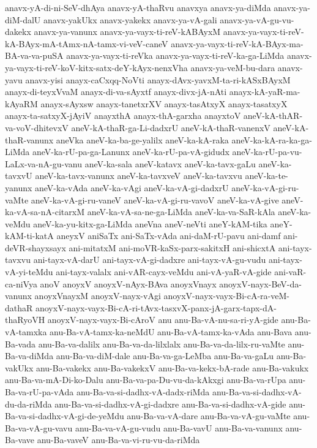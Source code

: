{anavx-yA-di-ni-SeV-dhAya
anavx-yA-thaRvu
anavxya
anavx-ya-diMda
anavx-ya-diM-dalU
anavx-yakUkx
anavx-yakekx
anavx-ya-vA-gali
anavx-ya-vA-gu-vu-dakekx
anavx-ya-vanunx
anavx-ya-vayx-ti-reV-kABAyxM
anavx-ya-vayx-ti-reV-kA-BAyx-mA-tAmx-nA-tamx-vi-veV-caneV
anavx-ya-vayx-ti-reV-kA-BAyx-ma-BA-va-va-puSA
anavx-ya-vayx-ti-reVka
anavx-ya-vayx-ti-reV-ka-ga-LiMda
anavx-ya-vayx-ti-reV-koV-kitx-satx-deY-kAyx-nenxVha
anavx-ya-veM-bu-dara
anavx-yavu
anavx-yisi
anayx-caCxqq-NoVti
anayx-dAvx-yavxM-ta-ri-kASxBAyxM
anayx-di-teyxVvaM
anayx-di-va-sAyxtf
anayx-divx-jA-nAti
anayx-kA-yaR-ma-kAyaRM
anayx-sAyxsw
anayx-tanetxrXV
anayx-tasAtxyX
anayx-tasatxyX
anayx-ta-satxyX-jAyiV
anayxthA
anayx-thA-garxha
anayxtoV
aneV-kA-thAR-va-voV-dhitevxV
aneV-kA-thaR-ga-Li-dadxrU
aneV-kA-thaR-vanenxV
aneV-kA-thaR-vanunx
aneVka
aneV-ka-ba-ge-yalilx
aneV-ka-kA-raka
aneV-ka-kA-ra-ka-ga-LiMda
aneV-ka-rU-pa-ga-Lanunx
aneV-ka-rU-pa-vA-gidudx
aneV-ka-rU-pa-vu-LaLx-va-nA-gu-vanu
aneV-ka-sala
aneV-katavx
aneV-ka-tavx-gaLu
aneV-ka-tavxvU
aneV-ka-tavx-vanunx
aneV-ka-tavxveV
aneV-ka-tavxvu
aneV-ka-te-yanunx
aneV-ka-vAda
aneV-ka-vAgi
aneV-ka-vA-gi-dadxrU
aneV-ka-vA-gi-ru-vaMte
aneV-ka-vA-gi-ru-vaneV
aneV-ka-vA-gi-ru-vavoV
aneV-ka-vA-give
aneV-ka-vA-sa-nA-citarxM
aneV-ka-vA-sa-ne-ga-LiMda
aneV-ka-va-SaR-kAla
aneV-ka-veMdu
aneV-ka-yu-kitx-ga-LiMda
aneVna
aneV-neVti
aneY-kAM-tika
aneY-kAM-ti-katA
aneyxV
aniSaTx
ani-SaTx-vAda
ani-daM-rU-pavu
ani-damf
ani-deVR-shayxsayx
ani-mitatxM
ani-moVR-kaSx-parx-sakitxH
ani-shicxtA
ani-tayx-tavxvu
ani-tayx-vA-darU
ani-tayx-vA-gi-dadxre
ani-tayx-vA-gu-vudu
ani-tayx-vA-yi-teMdu
ani-tayx-valalx
ani-vAR-cayx-veMdu
ani-vA-yaR-vA-gide
ani-vaR-ca-niVya
anoV
anoyxV
anoyxV-nAyx-BAva
anoyxVnayx
anoyxV-nayx-BeV-da-vanunx
anoyxVnayxM
anoyxV-nayx-vAgi
anoyxV-nayx-vayx-Bi-cA-ra-veM-dathaR
anoyxV-nayx-vayx-Bi-cA-ri-tAvx-tasxvX-panx-jA-garx-tapx-dA-thaRyoVH
anoyxV-nayx-vayx-Bi-cAroV
anu
anu-Ba-vA-nu-sa-ri-yA-gide
anu-Ba-vA-tamxka
anu-Ba-vA-tamx-ka-neMdU
anu-Ba-vA-tamx-ka-vAda
anu-Bava
anu-Ba-vada
anu-Ba-va-dalilx
anu-Ba-va-da-lilxlalx
anu-Ba-va-da-lilx-ru-vaMte
anu-Ba-va-diMda
anu-Ba-va-diM-dale
anu-Ba-va-ga-LeMba
anu-Ba-va-gaLu
anu-Ba-vakUkx
anu-Ba-vakekx
anu-Ba-vakekxV
anu-Ba-va-kekx-bA-rade
anu-Ba-vakukx
anu-Ba-va-mA-Di-ko-Dalu
anu-Ba-va-pa-Du-vu-da-kAkxgi
anu-Ba-va-rUpa
anu-Ba-va-rU-pa-vAda
anu-Ba-va-si-dadhx-vA-dadx-riMda
anu-Ba-va-si-dadhx-vA-du-da-riMda
anu-Ba-va-si-dadhx-vA-gi-dadxre
anu-Ba-va-si-dadhx-vA-gide
anu-Ba-va-si-dadhx-vA-gi-de-yeMdu
anu-Ba-va-vA-dare
anu-Ba-va-vA-gu-vaMte
anu-Ba-va-vA-gu-vavu
anu-Ba-va-vA-gu-vudu
anu-Ba-vavU
anu-Ba-va-vanunx
anu-Ba-vave
anu-Ba-vaveV
anu-Ba-va-vi-ru-vu-da-riMda
}
